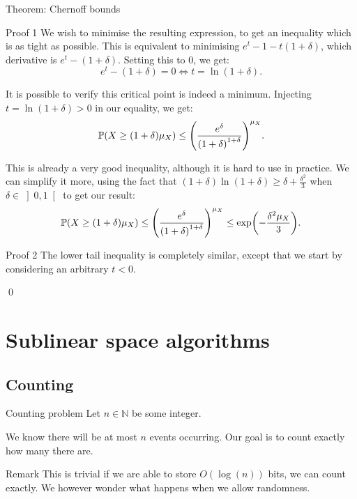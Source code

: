 \documentclass[a4paper]{article}
\begin{document}
\begin{parag}{Theorem: Chernoff bounds}
\begin{subparag}{Proof 1}
        We wish to minimise the resulting expression, to get an inequality which is as tight as possible. This is equivalent to minimising $e^t - 1 - t\left(1 + \delta\right)$, which derivative is $e^t - \left(1 + \delta\right)$. Setting this to $0$, we get: 
        \[e^t - \left(1 + \delta\right) = 0 \iff t = \ln\left(1 + \delta\right).\]

        It is possible to verify this critical point is indeed a minimum. Injecting $t = \ln\left(1 + \delta\right) > 0$ in our equality, we get:
        \[\prob\left(X \geq \left(1 + \delta\right) \mu_X\right) \leq \left(\frac{e^{\delta}}{\left(1+\delta\right)^{1 + \delta}}\right)^{\mu_X}.\]

        This is already a very good inequality, although it is hard to use in practice. We can simplify it more, using the fact that $\left(1 + \delta\right)\ln\left(1 + \delta\right) \geq \delta + \frac{\delta^2}{3}$ when $\delta \in \left]0, 1\right[ $ to get our result:
        \[\prob\left(X \geq \left(1 + \delta\right) \mu_X\right) \leq \left(\frac{e^{\delta}}{\left(1+\delta\right)^{1 + \delta}}\right)^{\mu_X} \leq \exp\left(-\frac{\delta^2 \mu_X}{3}\right).\]
    \end{subparag}

    \begin{subparag}{Proof 2}
        The lower tail inequality is completely similar, except that we start by considering an arbitrary $t < 0$.

        \qed
    \end{subparag}
\end{parag}

\section{Sublinear space algorithms}
\subsection{Counting}

\begin{parag}{Counting problem}
    Let $n \in \mathbb{N}$ be some integer. 

    We know there will be at most $n$ events occurring. Our goal is to count exactly how many there are.

    \begin{subparag}{Remark}
        This is trivial if we are able to store $O\left(\log\left(n\right)\right)$ bits, we can count exactly. We however wonder what happens when we allow randomness.
    \end{subparag}
\end{parag}
\end{document}
